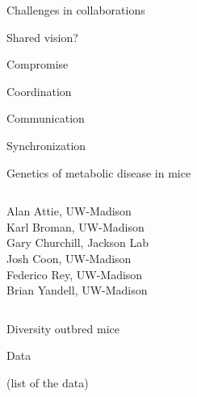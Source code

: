 \documentclass[aspectratio=169,12pt,t]{beamer}
\begin{document}
\begin{frame}[c]{Challenges in collaborations}

  \bi
  \itemsep12pt
{
\item Shared vision?
\item Compromise
\item Coordination
\item Communication
\item Synchronization
}
  \ei


\end{frame}


\begin{frame}[c]{Genetics of metabolic disease in mice}

  \begin{columns}
    \begin{column}{0.45\textwidth}

    Alan Attie, UW-Madison \\[12pt]
    Karl Broman, UW-Madison\\[12pt]
    Gary Churchill, Jackson Lab\\[12pt]
    Josh Coon, UW-Madison\\[12pt]
    Federico Rey, UW-Madison\\[12pt]
    Brian Yandell, UW-Madison

    \end{column}

    \begin{column}{0.45\textwidth}


    \end{column}
  \end{columns}


\end{frame}




\begin{frame}[c]{Diversity outbred mice}


\end{frame}



\begin{frame}[c]{Data}


(list of the data)


\end{frame}
\end{document}
